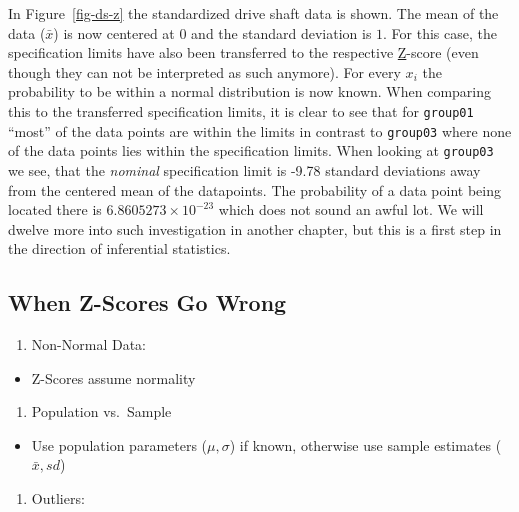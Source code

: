 \documentclass[
  a4paper,
]{scrbook}
\providecommand{\tightlist}{%
  \setlength{\itemsep}{0pt}\setlength{\parskip}{0pt}}\usepackage{longtable,booktabs,array}
\begin{document}
In Figure~\ref{fig-ds-z} the standardized drive shaft data is shown. The
mean of the data (\(\bar{x}\)) is now centered at \(0\) and the standard
deviation is \(1\). For this case, the specification limits have also
been transferred to the respective \hyperref[acronyms_Z]{Z}-score (even
though they can not be interpreted as such anymore). For every \(x_i\)
the probability to be within a normal distribution is now known. When
comparing this to the transferred specification limits, it is clear to
see that for \texttt{group01} ``most'' of the data points are within the
limits in contrast to \texttt{group03} where none of the data points
lies within the specification limits. When looking at \texttt{group03}
we see, that the \emph{nominal} specification limit is -9.78 standard
deviations away from the centered mean of the datapoints. The
probability of a data point being located there is
\ensuremath{6.8605273\times 10^{-23}} which does not sound an awful lot.
We will dwelve more into such investigation in another chapter, but this
is a first step in the direction of inferential statistics.

\subsection{When Z-Scores Go Wrong}\label{when-z-scores-go-wrong}

\begin{enumerate}
\def\labelenumi{\arabic{enumi}.}
\tightlist
\item
  Non-Normal Data:
\end{enumerate}

\begin{itemize}
\tightlist
\item
  Z-Scores assume normality
\end{itemize}

\begin{enumerate}
\def\labelenumi{\arabic{enumi}.}
\setcounter{enumi}{1}
\tightlist
\item
  Population vs.~Sample
\end{enumerate}

\begin{itemize}
\tightlist
\item
  Use population parameters (\(\mu,\sigma\)) if known, otherwise use
  sample estimates (\(\bar{x},sd\))
\end{itemize}

\begin{enumerate}
\def\labelenumi{\arabic{enumi}.}
\setcounter{enumi}{2}
\tightlist
\item
  Outliers:
\end{enumerate}
\end{document}
